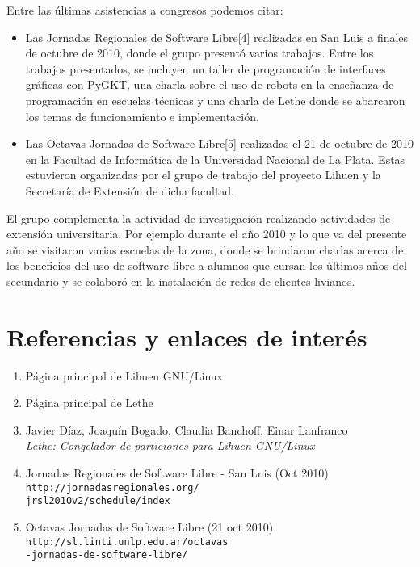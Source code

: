 \documentclass[final,narroweqnarray,inline,twoside]{ieee}
\newcommand{\itref}[1]{[{#1}]}
\begin{document}
Entre las últimas asistencias a congresos podemos citar:
\begin{itemize}
 \item Las Jornadas Regionales de Software Libre\itref{4}
realizadas en San Luis a finales de octubre de 2010, donde el grupo presentó varios trabajos.
Entre los trabajos presentados, se incluyen un taller de programación de
interfaces gráficas con PyGKT, una charla sobre
el uso de robots en la enseñanza de programación en escuelas técnicas y una
charla de Lethe donde se abarcaron los temas de
funcionamiento e implementación.
\item  Las Octavas Jornadas de Software Libre\itref{5} realizadas el 21 de octubre de 2010 en la Facultad de Informática de la
Universidad Nacional de La Plata. Estas estuvieron organizadas por el grupo de trabajo del proyecto Lihuen y la Secretaría de
Extensión de dicha facultad.
\end{itemize}

El grupo complementa la actividad de investigación realizando actividades de extensión universitaria. 
Por ejemplo durante el año 2010 y lo que va del presente año se visitaron varias
escuelas de la zona, donde se brindaron charlas acerca de los beneficios del uso de software libre 
a alumnos que cursan los últimos años del secundario y se colaboró en la instalación de redes
de clientes livianos.

\section{Referencias y enlaces de interés}

\begin{enumerate}
\item Página principal de Lihuen GNU/Linux\\
\item Página principal de Lethe\\
\item Javier Díaz, Joaquín Bogado, Claudia Banchoff, Einar Lanfranco
\\\textit{Lethe: Congelador de particiones para Lihuen GNU/Linux}\\
\item Jornadas Regionales de Software Libre - San Luis (Oct 2010)\\
\texttt{http://jornadasregionales.org/\\
jrsl2010v2/schedule/index}
\item Octavas Jornadas de Software Libre (21 oct 2010)\\
\texttt{http://sl.linti.unlp.edu.ar/octavas\\-jornadas-de-software-libre/}
\end{enumerate}
\end{document}
